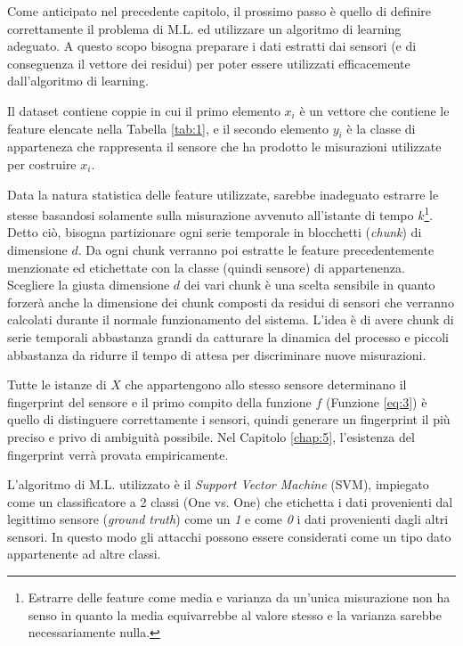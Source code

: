 \documentclass[Lau,binding=0.6cm]{sapthesis}
\begin{document}
Come anticipato nel precedente capitolo, il prossimo passo \`e quello di definire correttamente il problema di M.L. ed utilizzare un algoritmo di learning adeguato.
A questo scopo bisogna preparare i dati estratti dai sensori (e di conseguenza il vettore dei residui) per poter essere utilizzati efficacemente dall'algoritmo di learning.

Il dataset contiene coppie in cui il primo elemento $x_i$ \`e un vettore che contiene le feature elencate nella Tabella \ref{tab:1}, e il secondo elemento $y_i$ \`e la classe di apparteneza che rappresenta il sensore che ha prodotto le misurazioni utilizzate per costruire $x_i$.

Data la natura statistica delle feature utilizzate, sarebbe inadeguato estrarre le stesse basandosi solamente sulla misurazione avvenuto all'istante di tempo $k$\footnote{Estrarre delle feature come media e varianza da un'unica misurazione non ha senso in quanto la media equivarrebbe al valore stesso e la varianza sarebbe necessariamente nulla.}.
Detto ci\`o, bisogna partizionare ogni serie temporale in blocchetti (\textit{chunk}) di dimensione $d$. 
Da ogni chunk verranno poi estratte le feature precedentemente menzionate ed etichettate con la classe (quindi sensore) di appartenenza.
Scegliere la giusta dimensione $d$ dei vari chunk \`e una scelta sensibile in quanto forzer\`a anche la dimensione dei chunk composti da residui di sensori che verranno calcolati durante il normale funzionamento del sistema.
L'idea \`e di avere chunk di serie temporali abbastanza grandi da catturare la dinamica del processo e piccoli abbastanza da ridurre il tempo di attesa per discriminare nuove misurazioni.

Tutte le istanze di $X$ che appartengono allo stesso sensore determinano il fingerprint del sensore e il primo compito della funzione $f$ (Funzione \ref{eq:3}) \`e quello di distinguere correttamente i sensori, 
quindi generare un fingerprint il pi\`u preciso e privo di ambiguit\`a possibile. Nel Capitolo \ref{chap:5}, l'esistenza del fingerprint verr\`a provata empiricamente.

L'algoritmo di M.L. utilizzato \`e il \textit{Support Vector Machine} (SVM), impiegato come un classificatore a 2 classi (One vs. One) che etichetta i dati provenienti dal legittimo sensore (\textit{ground truth}) come un \textit{1}
e come \textit{0} i dati provenienti dagli altri sensori. In questo modo gli attacchi possono essere considerati come un tipo dato appartenente ad altre classi.
\end{document}
